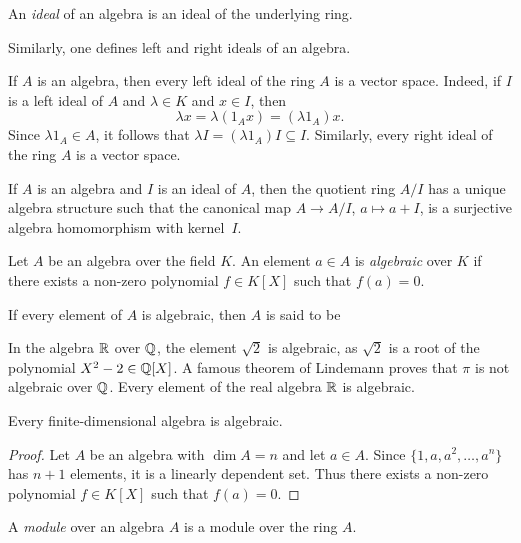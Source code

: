 \begin{definition}
 	An \emph{ideal} of an algebra is an ideal of the underlying ring.
\end{definition}

Similarly, one defines left and right ideals of an algebra.

If $A$ is an algebra, then every left ideal of the ring $A$ is a vector space.  
Indeed, if $I$ is a left ideal of $A$ 
and $\lambda\in K$ and $x\in I$, then 
\[
	\lambda x=\lambda (1_Ax)=(\lambda 1_A)x.
\]
Since $\lambda 1_A\in A$, it follows that  $\lambda I=(\lambda
1_A)I\subseteq I$. 
Similarly, every right ideal of the ring $A$ is a vector space. 

If $A$ is an algebra and $I$ is an ideal of $A$, then the quotient ring $A/I$ has a unique algebra
structure such that the canonical map  
$A\to A/I$, $a\mapsto a+I$, is a surjective algebra homomorphism with kernel~$I$. 

\begin{definition}
    Let $A$ be an algebra over the field $K$. An element $a\in A$ is 
    \emph{algebraic} over $K$ if there exists a non-zero polynomial $f\in K[X]$
    such that $f(a)=0$. 
\end{definition}

If every element of $A$ is algebraic, then $A$ is said to be  

In the algebra $\mathbb{R}$ over $\mathbb{Q}$, the element $\sqrt{2}$ is algebraic, as $\sqrt{2}$ is a root of the polynomial $X^2-2\in\mathbb{Q}[X]$. A famous theorem of Lindemann proves that $\pi$ is not algebraic over $\mathbb{Q}$. Every element of the real algebra $\mathbb{R}$ is algebraic.

\begin{proposition}
	\label{lem:algebraic}
	Every finite-dimensional algebra is algebraic.
\end{proposition}

\begin{proof}
   Let $A$ be an algebra with $\dim A=n$ and let $a\in A$. Since  
	$\{1,a,a^2,\dots,a^n\}$ has $n+1$ elements, it is a linearly dependent set. Thus there exists 
	a non-zero polynomial $f\in K[X]$ such that $f(a)=0$.
\end{proof}

\begin{definition}
    A \emph{module} over an algebra $A$ is a module 
    over the ring $A$.
\end{definition}

